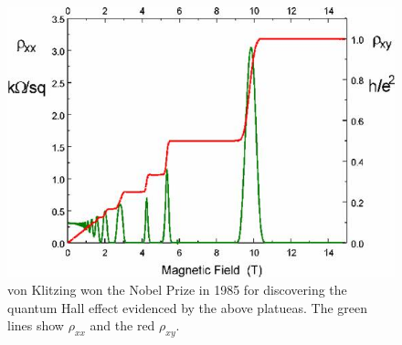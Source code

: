\begin{figure}
	\centering
	\includegraphics[width=0.5\linewidth]{images/QuantumHall}
	\caption{von Klitzing won the Nobel Prize in 1985 for discovering the quantum Hall effect evidenced by the above platueas. The green lines show $\rho_{xx}$ and the red $\rho_{xy}$. }
		
	
	\label{fig:quantumhall}
\end{figure}

